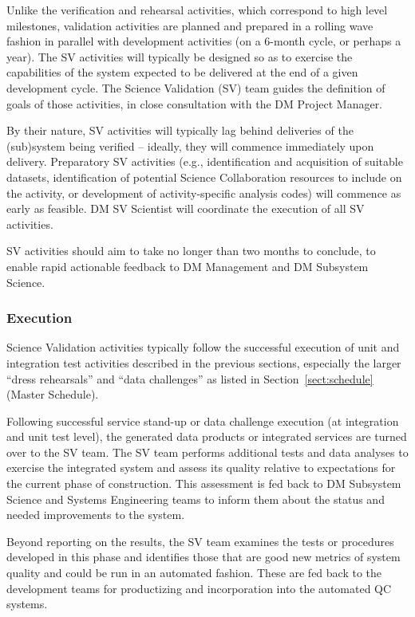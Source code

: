 Unlike the verification and rehearsal activities, which correspond to high
level milestones, validation activities are planned and prepared in a rolling
wave fashion in parallel with development activities (on a 6-month cycle, or
perhaps a year). The SV activities will typically be designed so as to
exercise the capabilities of the system expected to be delivered at the end of
a given development cycle.  The Science Validation (SV) team guides the
definition of goals of those activities, in close consultation with the DM
Project Manager.


By their nature, SV activities will typically lag behind
deliveries of the (sub)system being verified -- ideally, they will commence
immediately upon delivery. Preparatory SV activities (e.g., identification and
acquisition of suitable datasets, identification of potential Science
Collaboration resources to include on the activity, or development of
activity-specific analysis codes) will commence as early as feasible. DM SV
Scientist will coordinate the execution of all SV activities.

SV activities should aim to take no longer than two months to conclude, to
enable rapid actionable feedback to DM Management and DM Subsystem Science.

\subsubsection{Execution}

Science Validation activities typically follow the successful execution of
unit and integration test activities described in the previous sections,
especially the larger ``dress rehearsals'' and ``data challenges'' as
listed in Section~\ref{sect:schedule} (Master Schedule).

Following successful service stand-up or data challenge execution (at
integration and unit test level), the generated data products or integrated
services are turned over to the SV team.  The SV team performs additional
tests and data analyses to exercise the integrated system and assess its
quality relative to expectations for the current phase of construction.
This assessment is fed back to DM Subsystem Science and Systems Engineering
teams to inform them about the status and needed improvements to the system.

Beyond reporting on the results, the SV team examines the tests or
procedures developed in this phase and identifies those that are good new
metrics of system quality and could be run in an automated fashion.  These
are fed back to the development teams for productizing and incorporation
into the automated QC systems.

